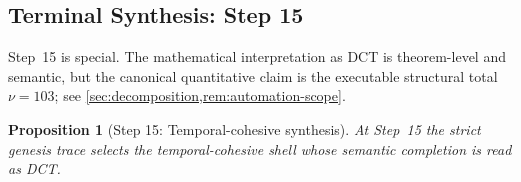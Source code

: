 \documentclass[11pt,a4paper]{article}
\theoremstyle{plain}
\newtheorem{proposition}[theorem]{Proposition}
\theoremstyle{definition}
\theoremstyle{remark}
\begin{document}
\subsection{Terminal Synthesis: Step 15}
\label{subsec:genesis-terminal-proof}

Step~15 is special.
The mathematical interpretation as DCT is theorem-level and semantic, but the
canonical quantitative claim is the executable structural total $\nu=103$;
see \cref{sec:decomposition,rem:automation-scope}.

\begin{proposition}[Step 15: Temporal-cohesive synthesis]
\label{prop:genesis-step15}
At Step~15 the strict genesis trace selects the temporal-cohesive shell whose
semantic completion is read as DCT.
\end{proposition}
\end{document}
